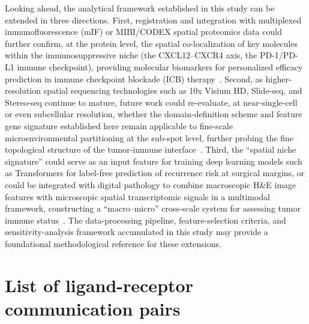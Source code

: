 \documentclass[12pt, a4paper]{article}
\begin{document}
Looking ahead, the analytical framework established in this study can be extended in three directions. First, registration and integration with multiplexed immunofluorescence (mIF) or MIBI/CODEX spatial proteomics data could further confirm, at the protein level, the spatial co-localization of key molecules within the immunosuppressive niche (the CXCL12--CXCR4 axis, the PD-1/PD-L1 immune checkpoint), providing molecular biomarkers for personalized efficacy prediction in immune checkpoint blockade (ICB) therapy~\citep{keren2018structured,zhu2021spark}. Second, as higher-resolution spatial sequencing technologies such as 10x Visium HD, Slide-seq, and Stereo-seq continue to mature, future work could re-evaluate, at near-single-cell or even subcellular resolution, whether the domain-definition scheme and feature gene signature established here remain applicable to fine-scale microenvironmental partitioning at the sub-spot level, further probing the fine topological structure of the tumor-immune interface~\citep{moses2022museum,chen2022spatia}. Third, the ``spatial niche signature'' could serve as an input feature for training deep learning models such as Transformers for label-free prediction of recurrence risk at surgical margins, or could be integrated with digital pathology to combine macroscopic H\&E image features with microscopic spatial transcriptomic signals in a multimodal framework, constructing a ``macro--micro'' cross-scale system for assessing tumor immune status~\citep{chen2016liver,shmatko2022artific}. The data-processing pipeline, feature-selection criteria, and sensitivity-analysis framework accumulated in this study may provide a foundational methodological reference for these extensions.


\newpage
\appendix
\renewcommand{\thesection}{\Alph{section}}

\section{List of ligand-receptor communication pairs}
\label{app:lr_table}
\end{document}
